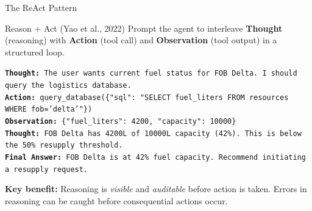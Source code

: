 \documentclass{beamer}
\begin{document}
\begin{frame}{The ReAct Pattern}
    \begin{block}{Reason + Act (Yao et al., 2022)}
        Prompt the agent to interleave \textbf{Thought} (reasoning) with \textbf{Action}
        (tool call) and \textbf{Observation} (tool output) in a structured loop.
    \end{block}

    \vspace{0.2cm}
    \begin{tcolorbox}[colback=backcolour, colframe=gray!50]
        \scriptsize
        \texttt{\textbf{Thought:} The user wants current fuel status for FOB Delta. I should query the logistics database.}\\[2pt]
        \texttt{\textbf{Action:} query\_database(\{"sql": "SELECT fuel\_liters FROM resources WHERE fob='delta'"\})}\\[2pt]
        \texttt{\textbf{Observation:} \{"fuel\_liters": 4200, "capacity": 10000\}}\\[2pt]
        \texttt{\textbf{Thought:} FOB Delta has 4200L of 10000L capacity (42\%). This is below the 50\% resupply threshold.}\\[2pt]
        \texttt{\textbf{Final Answer:} FOB Delta is at 42\% fuel capacity. Recommend initiating a resupply request.}
    \end{tcolorbox}

    \textbf{Key benefit:} Reasoning is \emph{visible} and \emph{auditable} before action is taken.
    Errors in reasoning can be caught before consequential actions occur.
\end{frame}
\end{document}
